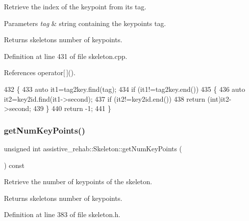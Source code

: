Retrieve the index of the keypoint from its tag. 


\begin{DoxyParams}{Parameters}
{\em tag} & string containing the keypoint\textquotesingle{}s tag. \\
\hline
\end{DoxyParams}
\begin{DoxyReturn}{Returns}
skeleton\textquotesingle{}s number of keypoints. 
\end{DoxyReturn}


Definition at line 431 of file skeleton.\+cpp.



References operator\mbox{[}$\,$\mbox{]}().


\begin{DoxyCode}
432 \{
433     \textcolor{keyword}{auto} it1=tag2key.find(tag);
434     \textcolor{keywordflow}{if} (it1!=tag2key.end())
435     \{
436         \textcolor{keyword}{auto} it2=key2id.find(it1->second);
437         \textcolor{keywordflow}{if} (it2!=key2id.end())
438             \textcolor{keywordflow}{return} (\textcolor{keywordtype}{int})it2->second;
439     \}
440     \textcolor{keywordflow}{return} -1;
441 \}
\end{DoxyCode}
\mbox{\label{classassistive__rehab_1_1Skeleton_ac5e5b98f2c9178f6e0def5033e27922f}} 
\subsubsection{\texorpdfstring{get\+Num\+Key\+Points()}{getNumKeyPoints()}}
{\footnotesize\ttfamily unsigned int assistive\+\_\+rehab\+::\+Skeleton\+::get\+Num\+Key\+Points (\begin{DoxyParamCaption}{ }\end{DoxyParamCaption}) const\hspace{0.3cm}{\ttfamily [inline]}}



Retrieve the number of keypoints of the skeleton. 

\begin{DoxyReturn}{Returns}
skeleton\textquotesingle{}s number of keypoints. 
\end{DoxyReturn}


Definition at line 383 of file skeleton.\+h.


